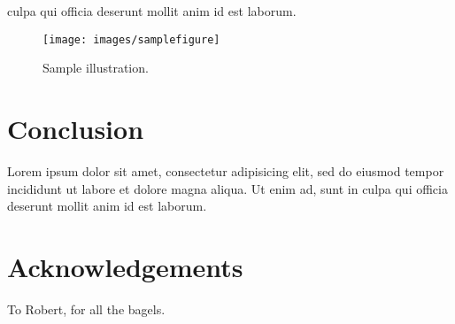 \documentclass[annual]{acmsiggraph}
\begin{document}
culpa qui officia deserunt mollit anim id est laborum.
\begin{figure}[ht]
  \centering
  \texttt{[image: images/samplefigure]}
  \caption{Sample illustration.}
\end{figure}

\section{Conclusion}

Lorem ipsum dolor sit amet, consectetur adipisicing elit, sed do
eiusmod tempor incididunt ut labore et dolore magna aliqua. Ut enim ad, sunt in
culpa qui officia deserunt mollit anim id est laborum.

\section*{Acknowledgements}

To Robert, for all the bagels.



\end{document}
